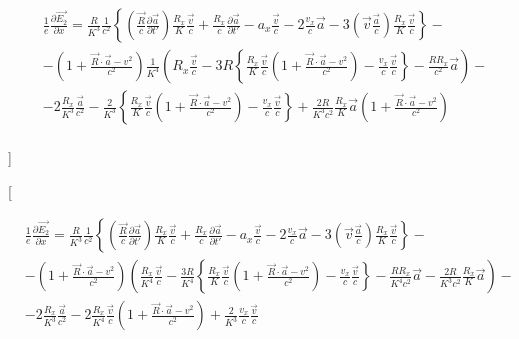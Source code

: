 \documentclass[11pt]{article}
\begin{document}
\begin{align}
  & \frac{1}{e}\frac{\partial \overrightarrow{{{E}_{2}}}}{\partial x}=\frac{R}{{{K}^{3}}}\frac{1}{{{c}^{2}}}\left\{ \left( \frac{\overrightarrow{R}}{c}\frac{\partial \overrightarrow{a}}{\partial t'} \right)\frac{{{R}_{x}}}{K}\frac{\overrightarrow{v}}{c}+\frac{{{R}_{x}}}{c}\frac{\partial \overrightarrow{a}}{\partial t'}-{{a}_{x}}\frac{\overrightarrow{v}}{c}-2\frac{{{v}_{x}}}{c}\overrightarrow{a}-3\left( \overrightarrow{v}\frac{\overrightarrow{a}}{c} \right)\frac{{{R}_{x}}}{K}\frac{\overrightarrow{v}}{c} \right\}- \\ 
 & -\left( 1+\frac{\overrightarrow{R}\cdot \overrightarrow{a}-{{v}^{2}}}{{{c}^{2}}} \right)\frac{1}{{{K}^{4}}}\left( {{R}_{x}}\frac{\overrightarrow{v}}{c}-3R\left\{ \frac{{{R}_{x}}}{K}\frac{\overrightarrow{v}}{c}\left( 1+\frac{\overrightarrow{R}\cdot \overrightarrow{a}-{{v}^{2}}}{{{c}^{2}}} \right)-\frac{{{v}_{x}}}{c}\frac{\overrightarrow{v}}{c} \right\}-\frac{R{{R}_{x}}}{{{c}^{2}}}\overrightarrow{a} \right)- \\ 
 & -2\frac{{{R}_{x}}}{{{K}^{3}}}\frac{\overrightarrow{a}}{{{c}^{2}}}-\frac{2}{{{K}^{3}}}\left\{ \frac{{{R}_{x}}}{K}\frac{\overrightarrow{v}}{c}\left( 1+\frac{\overrightarrow{R}\cdot \overrightarrow{a}-{{v}^{2}}}{{{c}^{2}}} \right)-\frac{{{v}_{x}}}{c}\frac{\overrightarrow{v}}{c} \right\}+\frac{2R}{{{K}^{3}}{{c}^{2}}}\frac{{{R}_{x}}}{K}\overrightarrow{a}\left( 1+\frac{\overrightarrow{R}\cdot \overrightarrow{a}-{{v}^{2}}}{{{c}^{2}}} \right) \\ 
\end{align}

{]}

{[}

\begin{align}
  & \frac{1}{e}\frac{\partial \overrightarrow{{{E}_{2}}}}{\partial x}=\frac{R}{{{K}^{3}}}\frac{1}{{{c}^{2}}}\left\{ \left( \frac{\overrightarrow{R}}{c}\frac{\partial \overrightarrow{a}}{\partial t'} \right)\frac{{{R}_{x}}}{K}\frac{\overrightarrow{v}}{c}+\frac{{{R}_{x}}}{c}\frac{\partial \overrightarrow{a}}{\partial t'}-{{a}_{x}}\frac{\overrightarrow{v}}{c}-2\frac{{{v}_{x}}}{c}\overrightarrow{a}-3\left( \overrightarrow{v}\frac{\overrightarrow{a}}{c} \right)\frac{{{R}_{x}}}{K}\frac{\overrightarrow{v}}{c} \right\}- \\ 
 & -\left( 1+\frac{\overrightarrow{R}\cdot \overrightarrow{a}-{{v}^{2}}}{{{c}^{2}}} \right)\left( \frac{{{R}_{x}}}{{{K}^{4}}}\frac{\overrightarrow{v}}{c}-\frac{3R}{{{K}^{4}}}\left\{ \frac{{{R}_{x}}}{K}\frac{\overrightarrow{v}}{c}\left( 1+\frac{\overrightarrow{R}\cdot \overrightarrow{a}-{{v}^{2}}}{{{c}^{2}}} \right)-\frac{{{v}_{x}}}{c}\frac{\overrightarrow{v}}{c} \right\}-\frac{R{{R}_{x}}}{{{K}^{4}}{{c}^{2}}}\overrightarrow{a}-\frac{2R}{{{K}^{3}}{{c}^{2}}}\frac{{{R}_{x}}}{K}\overrightarrow{a} \right)- \\ 
 & -2\frac{{{R}_{x}}}{{{K}^{3}}}\frac{\overrightarrow{a}}{{{c}^{2}}}-2\frac{{{R}_{x}}}{{{K}^{4}}}\frac{\overrightarrow{v}}{c}\left( 1+\frac{\overrightarrow{R}\cdot \overrightarrow{a}-{{v}^{2}}}{{{c}^{2}}} \right)+\frac{2}{{{K}^{3}}}\frac{{{v}_{x}}}{c}\frac{\overrightarrow{v}}{c} \\ 
\end{align}
\end{document}
